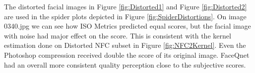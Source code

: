 

The distorted facial images in Figure \ref{fig:Distorted1} and Figure \ref{fig:Distorted2} are used in the spider plots depicted in Figure \ref{fig:SpiderDistortions}. On image 0340.jpg we can see how ISO Metrics predicted equal scores, but the facial image with noise had major effect on the score. This is consistent with the kernel estimation done on Distorted NFC subset in Figure \ref{fig:NFC2Kernel}. Even the Photoshop compression received double the score of its original image. FaceQnet had an overall more consistent quality perception close to the subjective scores.  


